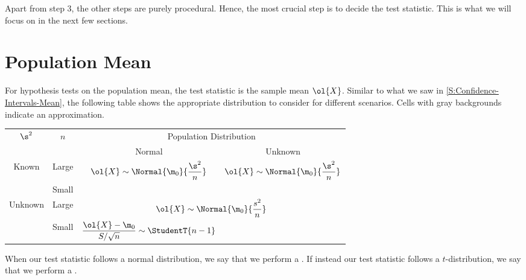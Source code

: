 Apart from step 3, the other steps are purely procedural. Hence, the most crucial step is to decide the test statistic. This is what we will focus on in the next few sections.

\section{Population Mean}

For hypothesis tests on the population mean, the test statistic is the sample mean $\ol{X}$. Similar to what we saw in \SS\ref{S:Confidence-Intervals-Mean}, the following table shows the appropriate distribution to consider for different scenarios. Cells with gray backgrounds indicate an approximation.

\begin{table}[H]
    \centering
    \bgroup
    \def\arraystretch{1.7}
    \begin{tabular}{|c|c|cc|}
    \hline
    \multirow{2}{*}{$\s^2$} & \multirow{2}{*}{$n$} & \multicolumn{2}{c|}{Population Distribution} \\ \cline{3-4} 
    &  & \multicolumn{1}{c|}{Normal} & Unknown \\ \hline
    \multirow{2}{*}{Known} & Large & \multicolumn{1}{c|}{\multirow{2}{*}{$\displaystyle \ol{X} \sim \Normal{\m_0}{\frac{\s^2}{n}}$}} & \cellcolor{black!20} $\displaystyle \ol{X} \sim \Normal{\m_0}{\frac{\s^2}{n}}$ \\ \cline{2-2} \cline{4-4} 
    & Small & \multicolumn{1}{c|}{} & \cellcolor{black} \\ \hline
    \multirow{2}{*}{Unknown} & Large & \multicolumn{2}{c|}{\cellcolor{black!20} $\displaystyle \ol{X} \sim \Normal{\m_0}{\frac{s^2}{n}}$} \\ \cline{2-4} 
    & Small & \multicolumn{1}{c|}{$\displaystyle \frac{\ol{X} - \m_0}{S/\sqrt{n}} \sim \StudentT{n-1}$} & \cellcolor{black} \\ \hline
    \end{tabular}
    \egroup
\end{table}

When our test statistic follows a normal distribution, we say that we perform a . If instead our test statistic follows a $t$-distribution, we say that we perform a .

